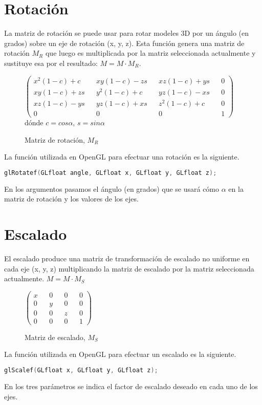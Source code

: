 \section{Rotación}
La matriz de rotación se puede usar para rotar modeles 3D por un ángulo (en grados) sobre un eje de rotación (x, y, z). Esta función genera una matriz de rotación $M_R$ que luego es multiplicada por la matriz seleccionada actualmente y sustituye esa por el resultado: $M = M \cdot M_R$.
\begin{figure} [ht]
  \centering
  \(
  \begin{pmatrix}
    x^2(1-c) + c  && xy(1-c) - zs && xz(1-c) + ys && 0\\
    xy(1-c) + zs && y^2(1-c) + c  && yz(1-c) - xs && 0\\
    xz(1-c) - ys && yz(1-c) + xs && z^2(1-c) + c  && 0\\
    0 && 0 && 0 && 1
  \end{pmatrix}
  \)
  \\dónde $c = cos \alpha$, $s = sin \alpha$ 
  \caption{Matriz de rotación, $M_R$}
\end{figure}

La función utilizada en OpenGL para efectuar una rotación es la siguiente.
\begin{lstlisting}[language=C]
  glRotatef(GLfloat angle, GLfloat x, GLfloat y, GLfloat z);
\end{lstlisting}
En los argumentos pasamos el ángulo (en grados) que se usará cómo $\alpha$ en la matriz de rotación y los valores de los ejes.

\section{Escalado}
El escalado produce una matriz de transformación de escalado no uniforme en cada eje (x, y, z) multiplicando la matriz de escalado por la matriz seleccionada actualmente. $M = M \cdot M_S$
\begin{figure} [ht]
  \centering
  \(
  \begin{pmatrix}
    x && 0 && 0 && 0\\
    0 && y && 0 && 0\\
    0 && 0 && z && 0\\
    0 && 0 && 0 && 1
  \end{pmatrix}
  \)
  \caption{Matriz de escalado, $M_S$}
\end{figure}

La función utilizada en OpenGL para efectuar un escalado es la siguiente.
\begin{lstlisting}[language=C]
  glScalef(GLfloat x, GLfloat y, GLfloat z);
\end{lstlisting}
En los tres parámetros se indica el factor de escalado deseado en cada uno de los ejes.

